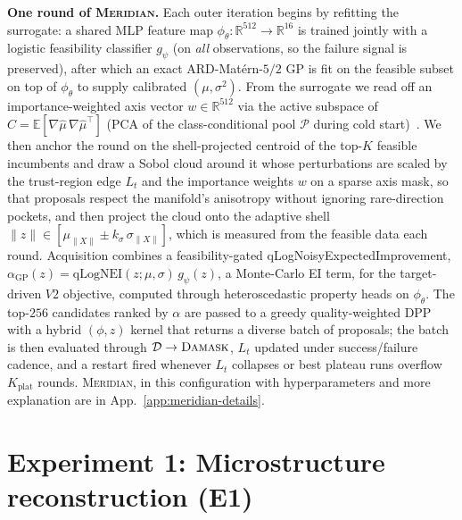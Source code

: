 \documentclass{article}
\newcommand{\meridian}{\textsc{Meridian}}
\newcommand{\damask}{\textsc{Damask}}
\newcommand{\Dec}{\mathcal{D}}
\newcommand{\R}{\mathbb{R}}
\newcommand{\E}{\mathbb{E}}
\begin{document}
\textbf{One round of \meridian{}.} Each outer iteration begins by refitting the surrogate: a shared MLP feature map $\phi_\theta : \R^{512} \to \R^{16}$ is trained jointly with a logistic feasibility classifier $g_\psi$ (on \emph{all} observations, so the failure signal is preserved), after which an exact ARD-Mat\'ern-$5/2$ GP is fit on the feasible subset on top of $\phi_\theta$ to supply calibrated $(\mu, \sigma^2)$. From the surrogate we read off an importance-weighted axis vector $w \in \R^{512}$ via the active subspace of $\hat C = \E[\nabla\hat\mu\,\nabla\hat\mu^\top]$ (PCA of the class-conditional pool $\mathcal P$ during cold start)~\citep{constantine2015}. We then anchor the round on the shell-projected centroid of the top-$K$ feasible incumbents and draw a Sobol cloud around it whose perturbations are scaled by the trust-region edge $L_t$ and the importance weights $w$ on a sparse axis mask, so that proposals respect the manifold's anisotropy without ignoring rare-direction pockets, and then project the cloud onto the adaptive shell $\| z\| \in [\mu_{\| X\|} \pm k_\sigma\, \sigma_{\| X\|}]$, which is measured from the feasible data each round. Acquisition combines a feasibility-gated qLogNoisyExpectedImprovement, $\alpha_{\mathrm{GP}}(z) = \mathrm{qLogNEI}(z; \mu, \sigma)\, g_\psi(z)$, a Monte-Carlo EI term, for the target-driven $V2$ objective, computed through heteroscedastic property heads on $\phi_\theta$. The top-$256$ candidates ranked by $\alpha$ are passed to a greedy quality-weighted DPP~\citep{kulesza2012} with a hybrid $(\phi, z)$ kernel that returns a diverse batch of proposals; the batch is then evaluated through $\Dec \to \damask{}$, $L_t$ updated under success/failure cadence, and a restart fired whenever $L_t$ collapses or best plateau runs overflow $K_{\mathrm{plat}}$ rounds. \meridian{}, in this configuration with hyperparameters and more explanation are in App.~\ref{app:meridian-details}.

\section{Experiment 1: Microstructure reconstruction (E1)}
\label{sec:experiments}
\label{sec:e1}
\end{document}
